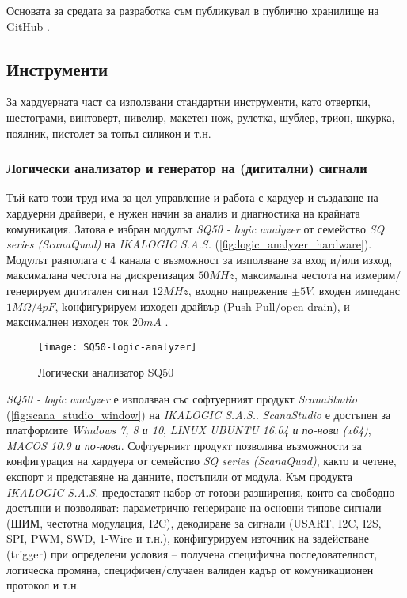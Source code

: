 Основата за средата за разработка съм публикувал в публично хранилище на GitHub \cite{github_stm32_base}.

\FloatBarrier


\subsection{Инструменти}

За хардуерната част са използвани стандартни инструменти, като отвертки, шестограми, винтоверт, нивелир, макетен нож, рулетка, шублер, трион, шкурка, поялник, пистолет за топъл силикон и т.н.


\subsubsection{Логически анализатор и генератор на (дигитални) сигнали}
\FloatBarrier
Тъй-като този труд  има за цел управление и работа с хардуер и 
създаване на хардуерни драйвери, е нужен начин за анализ и диагностика на крайната комуникация.
Затова е избран модулът \textit{SQ50 - logic analyzer } от семейство \textit{SQ series (ScanaQuad)} на  \textit{IKALOGIC S.A.S.} (\autoref{fig:logic_analyzer_hardware}).
Модулът разполага с \(4\) канала с възможност за използване за вход и/или изход,
максималана честота на дискретизация \(50MHz\),
максимална честота на измерим/генерируем дигитален сигнал \(12MHz\), 
входно напрежение \(\pm 5V\),
входен импеданс \(1M\Omega/4pF\),
kонфигурируем изходен драйвър (Push-Pull/open-drain),
и максималнен изходен ток \(20mA\) \cite{manual_sq50}.

\begin{figure}[hbpt!]
    \centering
    \texttt{[image: SQ50-logic-analyzer]}
    \caption{Логически анализатор SQ50}
    \label{fig:logic_analyzer_hardware}
\end{figure}


\FloatBarrier

\textit{SQ50 - logic analyzer } е използван със софтуерният продукт \textit{ScanaStudio} (\autoref{fig:scana_studio_window}) на \textit{IKALOGIC S.A.S.}.
\textit{ScanaStudio} е достъпен за платформите \textit{Windows 7, 8 и 10}, \textit{LINUX UBUNTU 16.04 и по-нови (x64)}, \textit{MACOS 10.9 и по-нови}.
Софтуерният продукт позволява възможности за конфигурация на хардуера от семейство \textit{SQ series (ScanaQuad)}, както и четене, експорт и представяне на
данните, постъпили от модула.
Към продукта \textit{IKALOGIC S.A.S.} предоставят набор от готови разширения, 
които са свободно достъпни и позволяват:
параметрично генериране на основни типове сигнали (ШИМ, честотна модулация, I2C),
декодиране за сигнали (USART, I2C, I2S, SPI, PWM, SWD, 1-Wire и т.н.),
конфигурируем източник на задействане (trigger) при определени условия -- получена специфична последователност, логическа промяна, специфичен/случаен валиден кадър от комуникационен протокол и т.н.


